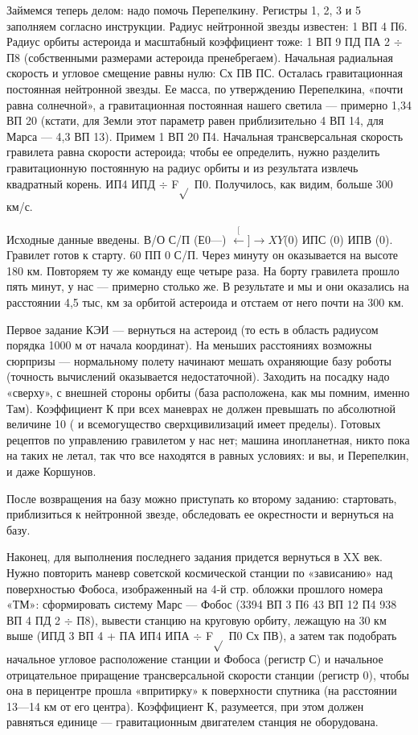 \documentclass[11pt,a4paper,oneside]{article}
\def\XY{$\stackrel[\leftarrow]{\rightarrow}{XY}$}
\begin{document}
Займемся теперь делом: надо помочь Перепелкину. Регистры 1, 2, 3 и 5 заполняем согласно инструкции. Радиус нейтронной звезды известен: 1 ВП 4 П6. Радиус орбиты астероида и масштабный коэффициент тоже: 1 ВП 9 ПД ПА 2 $\div$ П8 (собственными размерами астероида пренебрегаем). Начальная радиальная скорость и угловое смещение равны нулю: Сх ПВ ПС. Осталась гравитационная постоянная нейтронной звезды. Ее масса, по утверждению Перепелкина, «почти равна солнечной», а гравитационная постоянная нашего светила — примерно 1,34 ВП 20 (кстати, для Земли этот параметр равен приблизительно 4 ВП 14, для Марса — 4,3 ВП 13). Примем 1 ВП 20 П4. Начальная трансверсальная скорость гравилета равна скорости астероида; чтобы ее определить, нужно разделить гравитационную постоянную на радиус орбиты и из результата извлечь квадратный корень. ИП4 ИПД $\div$ F$\sqrt{}$ П0. Получилось, как видим, больше 300 км/с.

Исходные данные введены. В/О С/П (Е0—) \XY (0) ИПС (0) ИПВ (0). Гравилет готов к старту. 60 ПП 0 С/П. Через минуту он оказывается на высоте 180 км. Повторяем ту же команду еще четыре раза. На борту гравилета прошло пять минут, у нас — примерно столько же. В результате и мы и они оказались на расстоянии 4,5 тыс, км за орбитой астероида и отстаем от него почти на 300 км.

Первое задание КЭИ — вернуться на астероид (то есть в область радиусом порядка 1000 м от начала координат). На меньших расстояниях возможны сюрпризы — нормальному полету начинают мешать охраняющие базу роботы (точность вычислений оказывается недостаточной). Заходить на посадку надо «сверху», с внешней стороны орбиты (база расположена, как мы помним, именно Там). Коэффициент К при всех маневрах не должен превышать по абсолютной величине 10 ( и всемогущество сверхцивилизаций имеет пределы). Готовых рецептов по управлению гравилетом у нас нет; машина инопланетная, никто пока на таких не летал, так что все находятся в равных условиях: и вы, и Перепелкин, и даже Коршунов.

После возвращения на базу можно приступать ко второму заданию: стартовать, приблизиться к нейтронной звезде, обследовать ее окрестности и вернуться на базу.

Наконец, для выполнения последнего задания придется вернуться в XX век. Нужно повторить маневр советской космической станции по «зависанию» над поверхностью Фобоса, изображенный на 4-й стр. обложки прошлого номера «ТМ»: сформировать систему Марс — Фобос (3394 ВП 3 П6 43 ВП 12 П4 938 ВП 4 ПД 2 $\div$ П8), вывести станцию на круговую орбиту, лежащую на 30 км выше (ИПД 3 ВП 4 + ПА ИП4 ИПА $\div$ F$\sqrt{}$ П0 Сх ПВ), а затем так подобрать начальное угловое расположение станции и Фобоса (регистр С) и начальное отрицательное приращение трансверсальной скорости станции (регистр 0), чтобы она в перицентре прошла «впритирку» к поверхности спутника (на расстоянии 13—14 км от его центра). Коэффициент К, разумеется, при этом должен равняться единице — гравитационным двигателем станция не оборудована.
\end{document}
